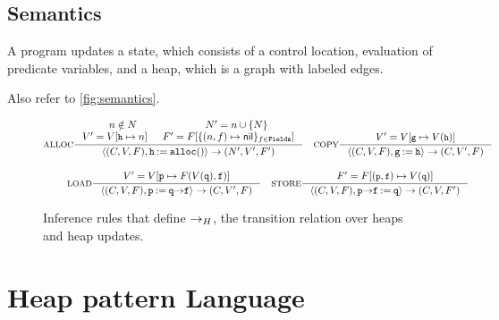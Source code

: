 \subsection{Semantics}
\label{sec:semantics}
%
A \lang program updates a state, which consists of a control location,
evaluation of predicate variables, and a heap, which is a graph with
labeled edges.
%

Also refer to \autoref{fig:semantics}.

\begin{figure*}
  \centering
  \begin{gather*}
    \inference[ALLOC]
    { n \notin N & N' = \add{n}{N} \\
      V' = \upd{V}{\cc{h}}{n}
      & F' = F[ \{ (n, f) \mapsto \nil \}_{f \in \fields} ]
    }
    { \langle (C, V, F), \code{h \assign \alloc()} \rangle \step
      (N', V', F')
    } \rulebuffer
    \inference[COPY]
    {  V' = \upd{V}{\cc{g}}{V(\cc{h})}
    }
    { \langle (C, V, F), \code{g \assign h} \rangle \step
      (C, V', F)
    } \\[\rowspace]
    \inference[LOAD]
    { V' = \upd{V}{\code{p}}{F(V(\code{q}), \code{f})}
    }
    { \langle (C, V, F), \code{p \assign q \select f} \rangle \step
      (C, V', F)
    } \rulebuffer
    \inference[STORE]
    { F' = \upd{F}{(\cc{p}, \cc{f})}{V(\cc{q})}
    }
    { \langle (C, V, F), \code{p \select f \assign q } \rangle
      \step
      (C, V, F')
    }
  \end{gather*}
  \caption{Inference rules that define $\rightarrow_H$, the transition
    relation over heaps and heap updates.}
  \label{fig:semantics}
\end{figure*}

\section{Heap pattern Language}
\label{sec:patterns}

